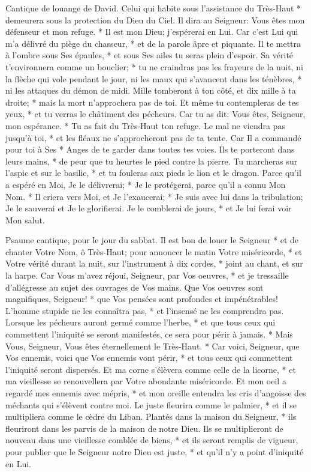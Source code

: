 Cantique de louange de David. Celui qui habite sous l'assistance du Très-Haut * demeurera sous la protection du Dieu du Ciel.
Il dira au Seigneur: Vous êtes mon défenseur et mon refuge. * Il est mon Dieu; j'espérerai en Lui.
Car c'est Lui qui m'a délivré du piège du chasseur, * et de la parole âpre et piquante.
Il te mettra à l'ombre sous Ses épaules, * et sous Ses ailes tu seras plein d'espoir.
Sa vérité t'environnera comme un bouclier; * tu ne craindras pas les frayeurs de la nuit,
ni la flèche qui vole pendant le jour, ni les maux qui s'avancent dans les ténèbres, * ni les attaques du démon de midi.
Mille tomberont à ton côté, et dix mille à ta droite; * mais la mort n'approchera pas de toi.
Et même tu contempleras de tes yeux, * et tu verras le châtiment des pécheurs.
Car tu as dit: Vous êtes, Seigneur, mon espérance. * Tu as fait du Très-Haut ton refuge.
Le mal ne viendra pas jusqu'à toi, * et les fléaux ne s'approcheront pas de ta tente.
Car Il a commandé pour toi à Ses * Anges de te garder dans toutes tes voies.
Ils te porteront dans leurs mains, * de peur que tu heurtes le pied contre la pierre.
Tu marcheras sur l'aspic et sur le basilic, * et tu fouleras aux pieds le lion et le dragon.
Parce qu'il a espéré en Moi, Je le délivrerai; * Je le protégerai, parce qu'il a connu Mon Nom. *
Il criera vers Moi, et Je l'exaucerai; * Je suis avec lui dans la tribulation; Je le sauverai et Je le glorifierai.
Je le comblerai de jours, * et Je lui ferai voir Mon salut.

Psaume cantique, pour le jour du sabbat.
Il est bon de louer le Seigneur * et de chanter Votre Nom, ô Très-Haut;
pour annoncer le matin Votre miséricorde, * et Votre vérité durant la nuit,
sur l'instrument à dix cordes, * joint au chant, et sur la harpe.
Car Vous m'avez réjoui, Seigneur, par Vos oeuvres, * et je tressaille d'allégresse au sujet des ouvrages de Vos mains.
Que Vos oeuvres sont magnifiques, Seigneur! * que Vos pensées sont profondes et impénétrables!
L'homme stupide ne les connaîtra pas, * et l'insensé ne les comprendra pas.
Lorsque les pécheurs auront germé comme l'herbe, * et que tous ceux qui commettent l'iniquité se seront manifestés, ce sera pour périr à jamais. *
Mais Vous, Seigneur, Vous êtes éternellement le Très-Haut. *
Car voici, Seigneur, que Vos ennemis, voici que Vos ennemis vont périr, * et tous ceux qui commettent l'iniquité seront dispersés.
Et ma corne s'élèvera comme celle de la licorne, * et ma vieillesse se renouvellera par Votre abondante miséricorde.
Et mon oeil a regardé mes ennemis avec mépris, * et mon oreille entendra les cris d'angoisse des méchants qui s'élèvent contre moi.
Le juste fleurira comme le palmier, * et il se multipliera comme le cèdre du Liban.
Plantés dans la maison du Seigneur, * ils fleuriront dans les parvis de la maison de notre Dieu.
Ils se multiplieront de nouveau dans une vieillesse comblée de biens, * et ils seront remplis de vigueur,
pour publier que le Seigneur notre Dieu est juste, * et qu'il n'y a point d'iniquité en Lui.


